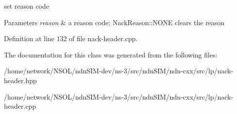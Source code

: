set reason code 


\begin{DoxyParams}{Parameters}
{\em reason} & a reason code; Nack\+Reason\+::\+N\+O\+NE clears the reason \\
\hline
\end{DoxyParams}


Definition at line 132 of file nack-\/header.\+cpp.



The documentation for this class was generated from the following files\+:\begin{DoxyCompactItemize}
\item 
/home/network/\+N\+S\+O\+L/ndn\+S\+I\+M-\/dev/ns-\/3/src/ndn\+S\+I\+M/ndn-\/cxx/src/lp/nack-\/header.\+hpp\item 
/home/network/\+N\+S\+O\+L/ndn\+S\+I\+M-\/dev/ns-\/3/src/ndn\+S\+I\+M/ndn-\/cxx/src/lp/nack-\/header.\+cpp\end{DoxyCompactItemize}
